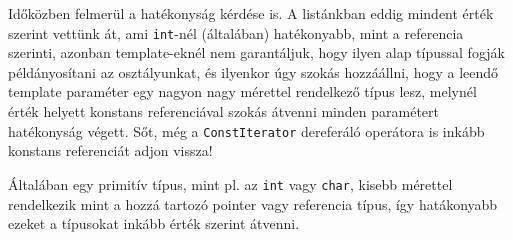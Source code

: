 \documentclass[a4paper,11.5pt]{article}
\begin{document}
	\medskip
	Időközben felmerül a hatékonyság kérdése is. A listánkban eddig mindent érték szerint vettünk át, ami \texttt{int}-nél (általában) hatékonyabb, mint a referencia szerinti, azonban template-eknél nem garantáljuk, hogy ilyen alap típussal fogják példányosítani az osztályunkat, és ilyenkor úgy szokás hozzáállni, hogy a leendő template paraméter egy nagyon nagy mérettel rendelkező típus lesz, melynél érték helyett konstans referenciával szokás átvenni minden paramétert hatékonyság végett. Sőt, még a \texttt{ConstIterator} dereferáló operátora is inkább konstans referenciát adjon vissza!
	\begin{note}
		Általában egy primitív típus, mint pl. az \texttt{int} vagy \texttt{char}, kisebb mérettel rendelkezik mint a hozzá tartozó pointer vagy referencia típus, így hatákonyabb ezeket a típusokat inkább érték szerint átvenni.
	\end{note}
	
\end{document}
